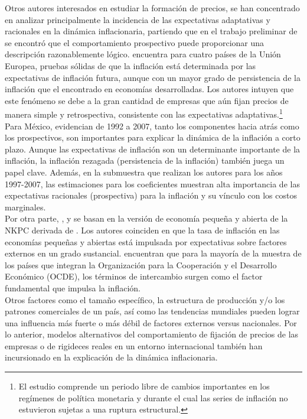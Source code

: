 Otros autores interesados en estudiar la formación de precios, se han concentrado en analizar principalmente la incidencia de las expectativas adaptativas y racionales en la dinámica inflacionaria, partiendo que en el trabajo preliminar de  \cite{gali1999inflation} se encontró que  el comportamiento prospectivo puede proporcionar una descripción razonablemente lógico. \cite{vavsivcek2011inflation} encuentra para cuatro países de la Unión Europea, pruebas sólidas de que la inflación está determinada por las expectativas de inflación futura, aunque con un mayor grado de persistencia de la inflación que el encontrado en economías desarrolladas. Los autores intuyen que este fenómeno se debe a la gran cantidad de empresas que aún fijan precios de manera simple y retrospectiva, consistente con las expectativas adaptativas.\footnote{El estudio comprende un periodo libre de cambios importantes en los regímenes de política monetaria y durante el cual las series de inflación no estuvieron sujetas a una ruptura estructural.} \\ 

Para México, \cite{ramos2008inflation} evidencian de 1992 a 2007, tanto los componentes hacia atrás como los prospectivos, son importantes para explicar la dinámica de la inflación a corto plazo. Aunque las expectativas de inflación son un determinante importante de la inflación, la inflación rezagada (persistencia de la inflación) también juega un papel clave. Además, en la submuestra que realizan los autores para los años 1997-2007, las estimaciones para los coeficientes muestran alta importancia de las expectativas racionales (prospectiva) para la inflación y su vínculo con los costos marginales.\\

Por otra parte,  \cite{leith2007estimated},  \cite{rumler2007estimates} y \cite{mihailov2011small}  se basan en la  versión de economía pequeña y abierta de la NKPC derivada de \cite{gali2005monetary}. Los autores coinciden en que la tasa de inflación en las economías pequeñas y abiertas está impulsada por expectativas sobre factores externos en un grado sustancial. \cite{mihailov2011small} encuentran que para la mayoría de la muestra de los países  que integran la Organización para la Cooperación y el Desarrollo Económico (OCDE),  los términos de intercambio surgen como el  factor fundamental que impulsa la inflación.\\

Otros factores como el tamaño específico, la estructura de producción y/o los patrones comerciales de un país, así como las tendencias mundiales pueden lograr una influencia más fuerte o más débil de factores externos versus nacionales. Por lo anterior,  modelos alternativos del comportamiento de fijación de precios de las empresas o de rigideces reales en un entorno internacional también han incursionado en la explicación de la dinámica inflacionaria.\\

